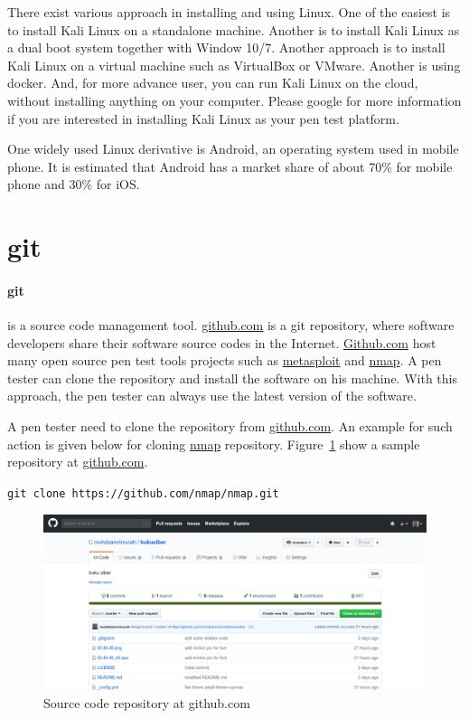 \documentclass[7x9]{times}
\begin{document}
There exist various approach in installing and using Linux.
One of the easiest is to install Kali Linux on a standalone
machine. Another is to install Kali Linux as a dual boot
system together with Window 10/7. Another approach is to
install Kali Linux on a virtual machine such as VirtualBox
or VMware. Another is using docker. And, for more advance
user, you can run Kali Linux on the cloud, without
installing anything on your computer. Please google for more
information if you are interested in installing Kali Linux
as your pen test platform. 


One widely used Linux derivative is Android, an operating
system used in mobile phone. It is estimated that Android
has a market share of about 70\% for mobile phone and 30\%
for iOS\@.



\section{git}

\paragraph{git}\cite{loeliger2012} is a source code
management tool. \url{github.com} is a git repository, where
software developers share their software source codes in the
Internet. \url{Github.com} host many open source pen test
tools projects such as \url{metasploit} and \url{nmap}. A
pen tester can clone the repository and install the software
on his machine. With this approach, the pen tester can
always use the latest version of the software.

A pen tester need to clone the repository from
\url{github.com}. An example for such action is given below
for cloning \url{nmap} repository. Figure~\ref{fig:github}
show a sample repository at \url{github.com}.


\verb|git clone https://github.com/nmap/nmap.git|



\begin{figure}
\centering
\includegraphics[width=.75\textwidth]{github-ui}
\caption{Source code repository at github.com}
\label{fig:github}
\end{figure}
\end{document}
